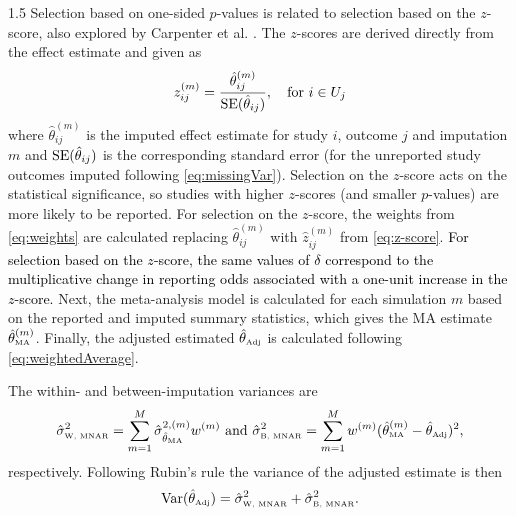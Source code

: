 \documentclass{article}
\newcommand{\mycolor}[1]{\textcolor{black}{#1}}
\begin{document}
\begin{spacing}{1.5}
Selection based on one-sided $p$-values is related to selection based on the $z$-score, also explored by Carpenter et al. \cite{carpenter2011assessing}.
The $z$-scores are derived directly from the effect estimate and given as \cite[p.170]{egger2022systematic}
\begin{equation} \label{eq:z-score}
z_{ij}^{(m)} = \frac{\hat\theta^{(m)}_{ij}}{\mbox{{SE}}(\hat\theta_{ij})}, \quad \text{for } i \in U_j
\end{equation}
where $\hat\theta^{(m)}_{ij}$ is the imputed effect estimate for study $i$, outcome $j$ and imputation $m$ and $\mbox{{SE}}(\hat\theta_{ij})$ is the corresponding standard error (for the unreported study outcomes imputed following \eqref{eq:missingVar}). Selection on the $z$-score acts on the statistical significance, so studies with higher $z$-scores (and smaller $p$-values) are more likely to be reported. For selection on the $z$-score, the weights from \eqref{eq:weights} are calculated replacing $\hat\theta_{ij}^{(m)}$ with  $\hat z_{ij}^{(m)}$ from \eqref{eq:z-score}. \mycolor{For selection based on the $z$-score, the same values of $\delta$ correspond to the multiplicative change in reporting odds associated with a one-unit increase in the $z$-score.} Next, the meta-analysis model is calculated for each simulation $m$ based on the reported and imputed summary statistics, which gives the  MA estimate $\hat\theta^{(m)}_{\tiny{\mbox{MA}}}$. Finally, the adjusted estimated $\hat\theta_{\tiny{\mbox{Adj}}}$ is calculated following \eqref{eq:weightedAverage}.

The within- and between-imputation variances are
\begin{equation*}
\hat\sigma_{\mbox{\tiny{W, MNAR}}}^2 = \sum^M_{m=1} \hat\sigma_{\hat\theta_{\tiny{\mbox{MA}}}}^{2, (m)} w^{(m)} \mbox{ and }
\hat\sigma_{\mbox{\tiny{B, MNAR}}}^2 = \sum^M_{m=1} w^{(m)} (\hat\theta^{(m)}_{\tiny{\mbox{MA}}} - \hat\theta_{\tiny{\mbox{Adj}}})^2, 
\end{equation*}
respectively. Following Rubin's rule the variance of the adjusted estimate is then
\begin{equation} \label{eq:var}
\mbox{{Var}}(\hat\theta_{\tiny{\mbox{Adj}}}) = \hat\sigma_{\mbox{\tiny{W, MNAR}}}^2 + \hat\sigma_{\mbox{\tiny{B, MNAR}}}^2.
\end{equation}


\end{spacing}
\end{document}
